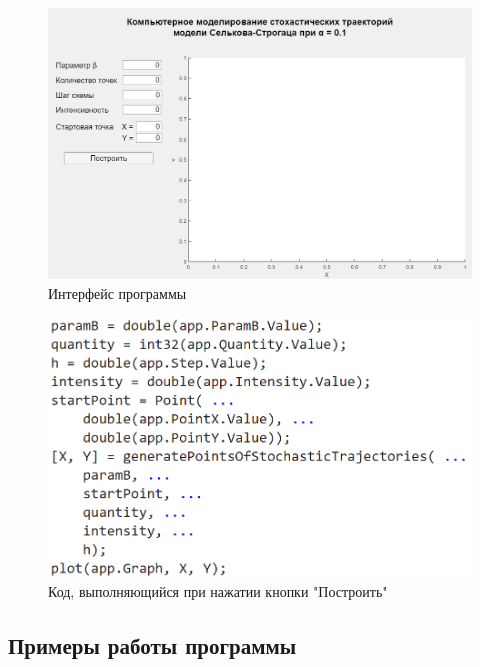 \documentclass[a4paper, 14pt]{article}
\begin{document}
			\begin{figure}[!ht]
				\begin{center}
					\includegraphics[scale=0.35]{img/interface.png}\caption{Интерфейс программы}
				\end{center}
			\end{figure}
						
			\begin{figure}[!ht]
				\begin{center}
					\includegraphics[scale=0.35]{img/callback.png}\caption{Код, выполняющийся при нажатии кнопки "Построить"}
				\end{center}
			\end{figure}
		
		\newpage		
		
		\subsection{Примеры работы программы}
		
\end{document}
